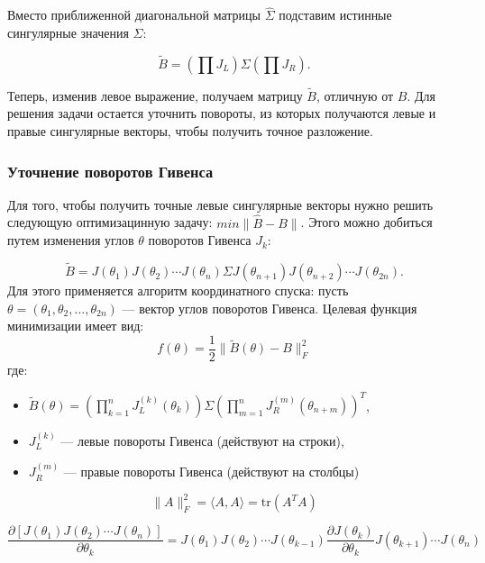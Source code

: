 Вместо приближенной диагональной матрицы \( \widehat{\Sigma} \) подставим истинные сингулярные значения \( \Sigma \):

\begin{equation}
\tilde{B} = \left( \prod J_L \right) \Sigma \left( \prod J_R \right).
\end{equation}

Теперь, изменив левое выражение, получаем матрицу $\tilde{B}$, отличную от $B$. Для решения задачи остается уточнить повороты, из которых получаются левые и правые сингулярные векторы, чтобы получить точное разложение.

\subsubsection{Уточнение поворотов Гивенса}

Для того, чтобы получить точные левые сингулярные векторы нужно решить следующую оптимизацинную задачу: \(min\| \widehat{B} - B \|\). Этого можно добиться путем изменения углов \( \theta \) поворотов Гивенса \( J_k \):

\begin{equation} \label{b_hat}
\tilde{B} = J(\theta_1) J(\theta_2) \cdots J(\theta_n) \Sigma J(\theta_{n+1}) J(\theta_{n+2}) \cdots J(\theta_{2n}).
\end{equation}
Для этого применяется алгоритм координатного спуска: пусть $\theta = (\theta_1, \theta_2, ..., \theta_{2n})$ — вектор углов поворотов Гивенса. 
Целевая функция минимизации имеет вид:
\begin{equation}
f(\theta) = \frac{1}{2} \| \tilde{B}(\theta) - B \|_F^2
\end{equation}
где: 

\begin{itemize}
\item $\tilde{B}(\theta) = \left( \prod_{k=1}^n J_L^{(k)}(\theta_k) \right) \Sigma \left( \prod_{m=1}^n J_R^{(m)}(\theta_{n+m}) \right)^T$, 
\item $J_L^{(k)}$ — левые повороты Гивенса (действуют на строки), 
\item $J_R^{(m)}$ — правые повороты Гивенса (действуют на столбцы)
\end{itemize}

\begin{note}
\begin{equation}
    \|A\|_F^2 = \langle A, A\rangle = \text{tr}\left(A^TA\right)
\end{equation}
\end{note}
\begin{note}
\begin{equation} \label{j_diff}
    \frac{\partial [J(\theta_1) J(\theta_2) \cdots J(\theta_n)]}{\partial \theta_k} =
    J(\theta_1) J(\theta_2) \cdots  J(\theta_{k-1})\frac{\partial J(\theta_k)}{\partial \theta_k}J(\theta_{k+1}) \cdots J(\theta_n)
\end{equation}
\end{note}

